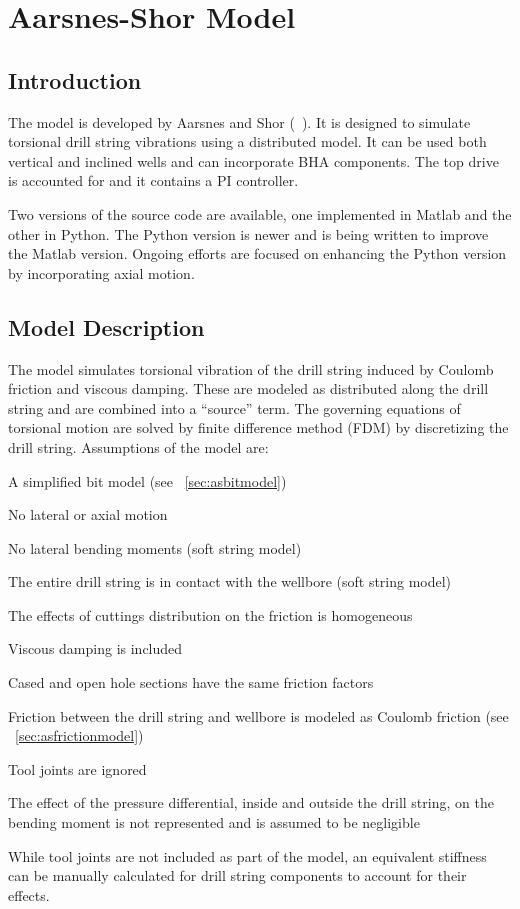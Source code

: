 \chapter{Aarsnes-Shor Model}
\label{ch:aarnessshormodel}

\section{Introduction}
The model is developed by Aarsnes and Shor (~\cite{ref:aarsnes2017a}). It is designed to simulate torsional drill string vibrations using a distributed model.  It can be used both vertical and inclined wells and can incorporate BHA components.  The top drive is accounted for and it contains a PI controller.

Two versions of the source code are available, one implemented in Matlab and the other in Python.  The Python version is newer and is being written to improve the Matlab version.  Ongoing efforts are focused on enhancing the Python version by incorporating axial motion.

\section{Model Description}
The model simulates torsional vibration of the drill string induced by Coulomb friction and viscous damping.  These are modeled as distributed along the drill string and are combined into a ``source'' term. The governing equations of torsional motion are solved by finite difference method (FDM) by discretizing the drill string. Assumptions of the model are:
\begin{bulletedlist}
	\item A simplified bit model (see \sectionname~\ref{sec:asbitmodel})
	\item No lateral or axial motion
    \item No lateral bending moments (soft string model)
    \item The entire drill string is in contact with the wellbore (soft string model)
	\item The effects of cuttings distribution on the friction is homogeneous
	\item Viscous damping is included
	\item Cased and open hole sections have the same friction factors
    \item Friction between the drill string and wellbore is modeled as Coulomb friction (see \sectionname~\ref{sec:asfrictionmodel})
    \item Tool joints are ignored
    \item The effect of the pressure differential, inside and outside the drill string, on the bending moment is not represented and is assumed to be negligible
\end{bulletedlist}
While tool joints are not included as part of the model, an equivalent stiffness can be manually calculated for drill string components to account for their effects.

